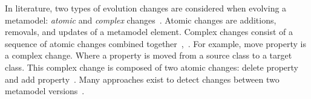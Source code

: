 
 In literature, two types of evolution changes are considered when evolving a metamodel: \emph{atomic} and \emph{complex} changes~\cite{hebig2016approaches,Herrmannsdoerfer2011}. 
 Atomic changes are additions, removals, and updates of a metamodel element. Complex changes consist of a sequence of atomic changes combined together~\cite{vermolen_reconstructing_2012},~\cite{khelladi2015detecting}. For example, move property is a complex change. Where a property is moved from a source class to a target class. This complex change is composed of two atomic changes: delete property and add property~\cite{Herrmannsdoerfer2011}. 
 Many approaches exist to detect changes between two metamodel versions~\cite{Alter2015, williams2012searching,cicchetti_managing_2009,langer_posteriori_2013,vermolen_reconstructing_2012,Khelladi2016,bettini2022executable}.
% 	
% 		
% 	
 	
 	  
 
 				

 	
 	



